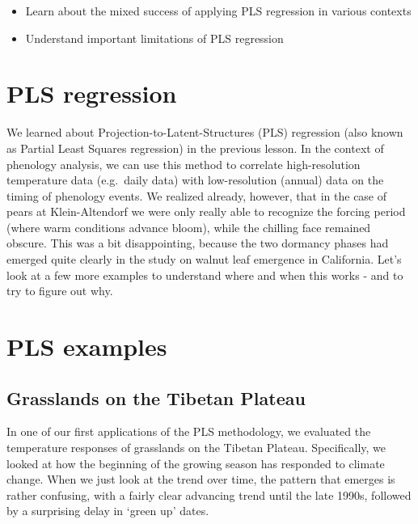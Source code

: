\documentclass[
]{book}
\providecommand{\tightlist}{%
  \setlength{\itemsep}{0pt}\setlength{\parskip}{0pt}}
\begin{document}
\begin{itemize}
\tightlist
\item
  Learn about the mixed success of applying PLS regression in various contexts
\item
  Understand important limitations of PLS regression
\end{itemize}

\hypertarget{pls-regression}{%
\section{PLS regression}\label{pls-regression}}

We learned about Projection-to-Latent-Structures (PLS) regression (also known as Partial Least Squares regression) in the previous lesson. In the context of phenology analysis, we can use this method to correlate high-resolution temperature data (e.g.~daily data) with low-resolution (annual) data on the timing of phenology events. We realized already, however, that in the case of pears at Klein-Altendorf we were only really able to recognize the forcing period (where warm conditions advance bloom), while the chilling face remained obscure. This was a bit disappointing, because the two dormancy phases had emerged quite clearly in the study on walnut leaf emergence in California. Let's look at a few more examples to understand where and when this works - and to try to figure out why.

\hypertarget{pls-examples}{%
\section{PLS examples}\label{pls-examples}}

\hypertarget{grasslands-on-the-tibetan-plateau}{%
\subsection{Grasslands on the Tibetan Plateau}\label{grasslands-on-the-tibetan-plateau}}

In one of our first applications of the PLS methodology, we evaluated the temperature responses of grasslands on the Tibetan Plateau. Specifically, we looked at how the beginning of the growing season has responded to climate change. When we just look at the trend over time, the pattern that emerges is rather confusing, with a fairly clear advancing trend until the late 1990s, followed by a surprising delay in `green up' dates.
\end{document}
